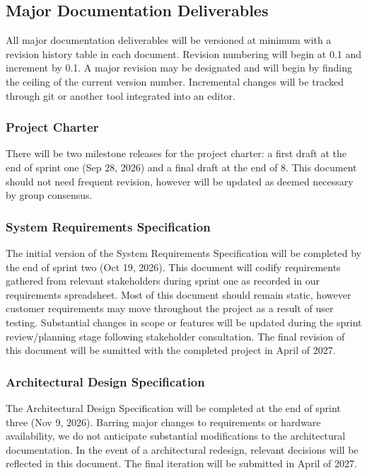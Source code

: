 
\subsection{Major Documentation Deliverables}
All major documentation deliverables will be versioned at minimum with a revision history table in each document. Revision numbering will begin at 0.1 and increment by 0.1. A major revision may be designated and will begin by finding the ceiling of the current version number. Incremental changes will be tracked through git or another tool integrated into an editor.
\subsubsection{Project Charter}
There will be two milestone releases for the project charter: a first draft at the end of sprint one (Sep 28, 2026) and a final draft at the end of 8. This document should not need frequent revision, however will be updated as deemed necessary by group consensus.

\subsubsection{System Requirements Specification}
The initial version of the System Requirements Specification will be completed by the end of sprint two (Oct 19, 2026). This document will codify requirements gathered from relevant stakeholders during sprint one as recorded in our requirements spreadsheet. Most of this document should remain static, however customer requirements may move throughout the project as a result of user testing. Substantial changes in scope or features will be updated during the sprint review/planning stage following stakeholder consultation. The final revision of this document will be sumitted with the completed project in April of 2027.

\subsubsection{Architectural Design Specification}
The Architectural Design Specification will be completed at the end of sprint three (Nov 9, 2026). Barring major changes to requirements or hardware availability, we do not anticipate substantial modifications to the architectural documentation. In the event of a architectural redesign, relevant decisions will be reflected in this document. The final iteration will be submitted in April of 2027.

